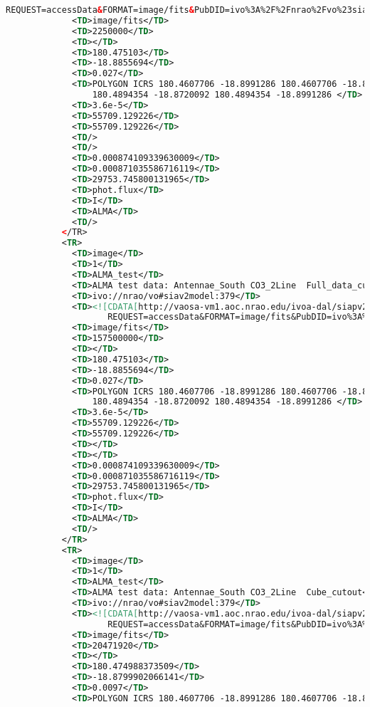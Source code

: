 \documentclass[11pt,a4paper]{ivoa}
\begin{document}
\begin{lstlisting}[basicstyle=\scriptsize,language=XML]
                    REQUEST=accessData&FORMAT=image/fits&PubDID=ivo%3A%2F%2Fnrao%2Fvo%23siav2model%3A374]]></TD>
             <TD>image/fits</TD>
             <TD>2250000</TD>
             <TD></TD>
             <TD>180.475103</TD>
             <TD>-18.8855694</TD>
             <TD>0.027</TD>
             <TD>POLYGON ICRS 180.4607706 -18.8991286 180.4607706 -18.8720092
                 180.4894354 -18.8720092 180.4894354 -18.8991286 </TD>
             <TD>3.6e-5</TD>
             <TD>55709.129226</TD>
             <TD>55709.129226</TD>
             <TD/>
             <TD/>
             <TD>0.000874109339630009</TD>
             <TD>0.000871035586716119</TD>
             <TD>29753.745800131965</TD>
             <TD>phot.flux</TD>
             <TD>I</TD>
             <TD>ALMA</TD>
             <TD/>
           </TR>
           <TR>
             <TD>image</TD>
             <TD>1</TD>
             <TD>ALMA_test</TD>
             <TD>ALMA test data: Antennae_South CO3_2Line  Full_data_cube</TD>
             <TD>ivo://nrao/vo#siav2model:379</TD>
             <TD><![CDATA[http://vaosa-vm1.aoc.nrao.edu/ivoa-dal/siapv2-vao/sync?
                    REQUEST=accessData&FORMAT=image/fits&PubDID=ivo%3A%2F%2Fnrao%2Fvo%23siav2model%3A379]]></TD>
             <TD>image/fits</TD>
             <TD>157500000</TD>
             <TD></TD>
             <TD>180.475103</TD>
             <TD>-18.8855694</TD>
             <TD>0.027</TD>
             <TD>POLYGON ICRS 180.4607706 -18.8991286 180.4607706 -18.8720092
                 180.4894354 -18.8720092 180.4894354 -18.8991286 </TD>
             <TD>3.6e-5</TD>
             <TD>55709.129226</TD>
             <TD>55709.129226</TD>
             <TD></TD>
             <TD></TD>
             <TD>0.000874109339630009</TD>
             <TD>0.000871035586716119</TD>
             <TD>29753.745800131965</TD>
             <TD>phot.flux</TD>
             <TD>I</TD>
             <TD>ALMA</TD>
             <TD/>
           </TR>
           <TR>
             <TD>image</TD>
             <TD>1</TD>
             <TD>ALMA_test</TD>
             <TD>ALMA test data: Antennae_South CO3_2Line  Cube_cutout</TD>
             <TD>ivo://nrao/vo#siav2model:379</TD>
             <TD><![CDATA[http://vaosa-vm1.aoc.nrao.edu/ivoa-dal/siapv2-vao/sync?
                    REQUEST=accessData&FORMAT=image/fits&PubDID=ivo%3A%2F%2Fnrao%2Fvo%23image-m0RXVX]]></TD>
             <TD>image/fits</TD>
             <TD>20471920</TD>
             <TD></TD>
             <TD>180.474988373509</TD>
             <TD>-18.8799902066141</TD>
             <TD>0.0097</TD>
             <TD>POLYGON ICRS 180.4607706 -18.8991286 180.4607706 -18.8720092

\end{lstlisting}
\end{document}
